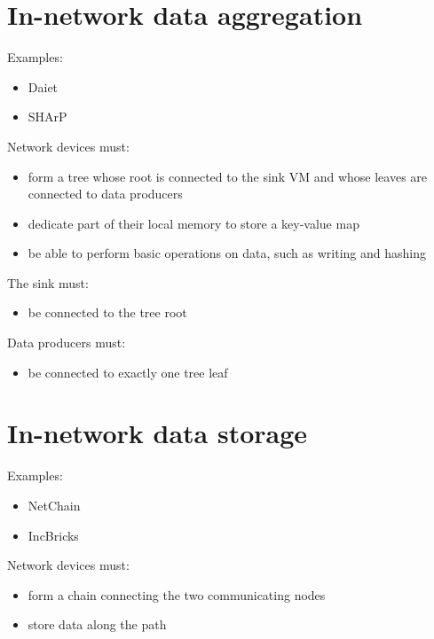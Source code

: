 \section{In-network data aggregation}
Examples:
\begin{itemize}
    \item Daiet \cite{daiet}
    \item SHArP \cite{sharp}
\end{itemize}
Network devices must:
\begin{itemize}
    \item form a tree whose root is connected to the sink VM and whose leaves are connected to data producers
    \item dedicate part of their local memory to store a key-value map
    \item be able to perform basic operations on data, such as writing and hashing
\end{itemize}
The sink must:
\begin{itemize}
    \item be connected to the tree root
\end{itemize}
Data producers must:
\begin{itemize}
    \item be connected to exactly one tree leaf
\end{itemize}

\section{In-network data storage}
Examples:
\begin{itemize}
    \item NetChain \cite{netchain}
    \item IncBricks \cite{incbricks}
\end{itemize}
Network devices must:
\begin{itemize}
    \item form a chain connecting the two communicating nodes
    \item store data along the path
\end{itemize}